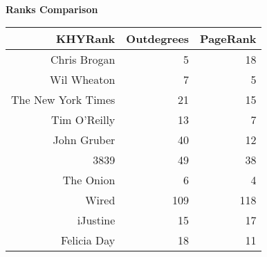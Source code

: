 \-\\
\textbf{Ranks Comparison}\\
\begin{tabular}{|r|r|r|}
\hline
KHYRank & Outdegrees & PageRank\\
\hline
Chris Brogan & 5 & 18 \\
Wil Wheaton & 7 & 5 \\
The New York Times & 21 & 15 \\
Tim O'Reilly & 13 & 7 \\
John Gruber & 40 & 12 \\
3839 & 49 & 38 \\
The Onion & 6 & 4 \\
Wired & 109 & 118 \\
iJustine & 15 & 17 \\
Felicia Day & 18 & 11 \\
\hline
\end{tabular}
%
%


